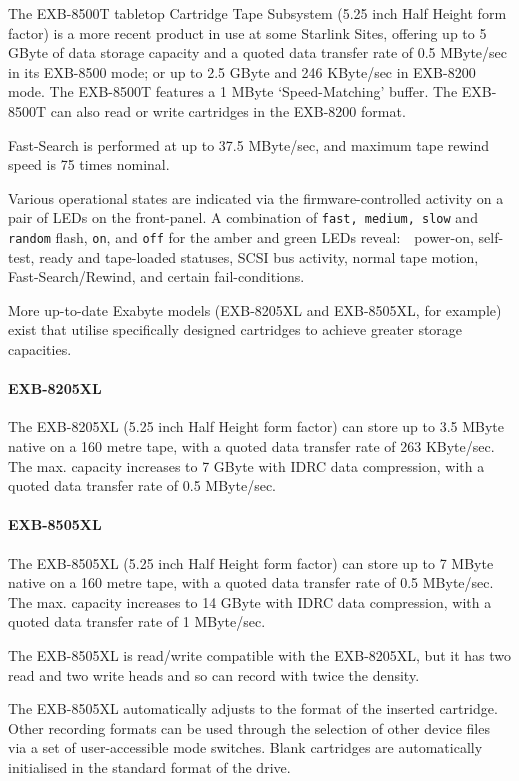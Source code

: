 \documentclass[11pt]{article}
\begin{document}
The EXB-8500T tabletop Cartridge Tape Subsystem (5.25 inch Half Height form
factor) is a more recent product in use at some Starlink Sites, offering up
to 5 GByte of data storage capacity and a quoted data transfer rate of 0.5
MByte/sec in its EXB-8500 mode; or up to 2.5 GByte and 246 KByte/sec in
EXB-8200 mode. The EXB-8500T features a 1 MByte `Speed-Matching' buffer. The
EXB-8500T can also read or write cartridges in the EXB-8200 format.

Fast-Search is performed at up to 37.5 MByte/sec, and maximum tape rewind
speed is 75 times nominal.

Various operational states are indicated via the firmware-controlled activity
on a pair of LEDs on the front-panel. A combination of {\tt fast, medium, slow}
and {\tt random} flash, {\tt on}, and {\tt off} for the amber and green
LEDs reveal:\ \ power-on, self-test, ready and tape-loaded statuses, SCSI bus
activity, normal tape motion, Fast-Search/Rewind, and certain fail-conditions.

More up-to-date Exabyte models (EXB-8205XL and EXB-8505XL, for example)
exist that utilise specifically designed cartridges to achieve greater
storage capacities.

\paragraph {EXB-8205XL}

The EXB-8205XL (5.25 inch Half Height form factor) can store up to 3.5 MByte
native on a 160 metre tape, with a quoted data transfer rate of 263
KByte/sec. The max. capacity increases to 7 GByte with IDRC data compression,
with a quoted data transfer rate of 0.5 MByte/sec.

\paragraph {EXB-8505XL}

The EXB-8505XL (5.25 inch Half Height form factor) can store up to 7 MByte
native on a 160 metre tape, with a quoted data transfer rate of 0.5
MByte/sec. The max. capacity increases to 14 GByte with IDRC data compression,
with a quoted data transfer rate of 1 MByte/sec.

The EXB-8505XL is read/write compatible with the EXB-8205XL, but it has two
read and two write heads and so can record with twice the density.

The EXB-8505XL automatically adjusts to the format of the inserted cartridge.
Other recording formats can be used through the selection of other device
files via a set of user-accessible mode switches. Blank cartridges are
automatically initialised in the standard format of the drive.
\end{document}
